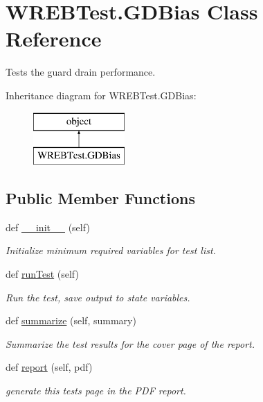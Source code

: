 \hypertarget{class_w_r_e_b_test_1_1_g_d_bias}{}\section{W\+R\+E\+B\+Test.\+G\+D\+Bias Class Reference}
\label{class_w_r_e_b_test_1_1_g_d_bias}


Tests the guard drain performance.  


Inheritance diagram for W\+R\+E\+B\+Test.\+G\+D\+Bias\+:\begin{figure}[H]
\begin{center}
\leavevmode
\includegraphics[height=2.000000cm]{class_w_r_e_b_test_1_1_g_d_bias}
\end{center}
\end{figure}
\subsection*{Public Member Functions}
\begin{DoxyCompactItemize}
\item 
def \hyperlink{class_w_r_e_b_test_1_1_g_d_bias_acf053e4e6e21e4a84814cfeb775f4c6b}{\+\_\+\+\_\+init\+\_\+\+\_\+} (self)
\begin{DoxyCompactList}\small\item\em Initialize minimum required variables for test list. \end{DoxyCompactList}\item 
def \hyperlink{class_w_r_e_b_test_1_1_g_d_bias_a994b19e58792f80591e2dc4dd4629bea}{run\+Test} (self)
\begin{DoxyCompactList}\small\item\em Run the test, save output to state variables. \end{DoxyCompactList}\item 
def \hyperlink{class_w_r_e_b_test_1_1_g_d_bias_a06f39560e8ecafd5299efd10e28dd7e9}{summarize} (self, summary)
\begin{DoxyCompactList}\small\item\em Summarize the test results for the cover page of the report. \end{DoxyCompactList}\item 
def \hyperlink{class_w_r_e_b_test_1_1_g_d_bias_a75fa14d7339831f013814bf1ca996f31}{report} (self, pdf)
\begin{DoxyCompactList}\small\item\em generate this test\textquotesingle{}s page in the P\+DF report. \end{DoxyCompactList}\end{DoxyCompactItemize}


